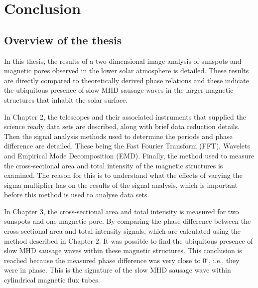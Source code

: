 \graphicspath{{Chapter6/Figs/}}

\chapter{Conclusion}
    
    \vspace*{\fill}\par
    \pagebreak

\section{Overview of the thesis}
    
	In this thesis, the results of a two-dimensional image analysis of sunspots and magnetic pores observed in the lower solar atmosphere is detailed.
    These results are directly compared to theoretically derived phase relations and these indicate the ubiquitous presence of slow MHD sausage waves in the larger magnetic structures that inhabit the solar surface.
    
    In Chapter 2, the telescopes and their associated instruments that supplied the science ready data sets are described, along with brief data reduction details.
    Then the signal analysis methods used to determine the periods and phase difference are detailed.
    These being the Fast Fourier Transform (FFT), Wavelets and Empirical Mode Decomposition (EMD).
    Finally, the method used to measure the cross-sectional area and total intensity of the magnetic structures is examined.
    The reason for this is to understand what the effects of varying the sigma multiplier has on the results of the signal analysis, which is important before this method is used to analyse data sets.
    
    In Chapter 3, the cross-sectional area and total intensity is measured for two sunspots and one magnetic pore.
    By comparing the phase difference between the cross-sectional area and total intensity signals, which are calculated using the method described in Chapter 2.
    It was possible to find the ubiquitous presence of slow MHD sausage waves within these magnetic structures.
    This conclusion is reached because the measured phase difference was very close to 0$^\circ$, i.e., they were in phase.
    This is the signature of the slow MHD sausage wave within cylindrical magnetic flux tubes.
    
